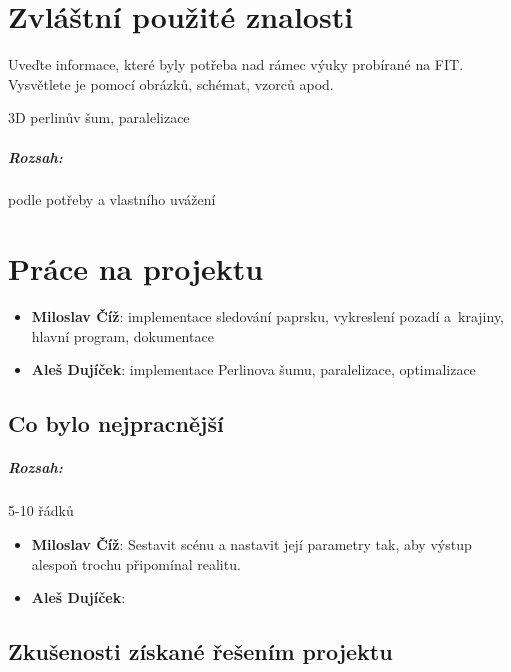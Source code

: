 \documentclass[12pt,a4paper,titlepage,final]{report}
\newcommand\AuthorA{Miloslav Číž}
\newcommand\AuthorB{Aleš Dujíček}
\begin{document}
\chapter{Zvláštní použité znalosti}

Uveďte informace, které byly potřeba nad rámec výuky probírané na FIT.
Vysvětlete je pomocí obrázků, schémat, vzorců apod.

3D perlinův šum, paralelizace

\paragraph{Rozsah:} podle potřeby a vlastního uvážení


\chapter{Práce na projektu}

\begin{itemize}
\item \textbf{\AuthorA}: implementace sledování paprsku, vykreslení pozadí a~krajiny, hlavní program, dokumentace
\item \textbf{\AuthorB}: implementace Perlinova šumu, paralelizace, optimalizace
\end{itemize}

\section{Co bylo nejpracnější}

\paragraph{Rozsah:} 5-10 řádků

\begin{itemize}
\item \textbf{\AuthorA}: Sestavit scénu a nastavit její parametry tak,
aby výstup alespoň trochu připomínal realitu.
\item \textbf{\AuthorB}:
\end{itemize}

\section{Zkušenosti získané řešením projektu}
\end{document}
